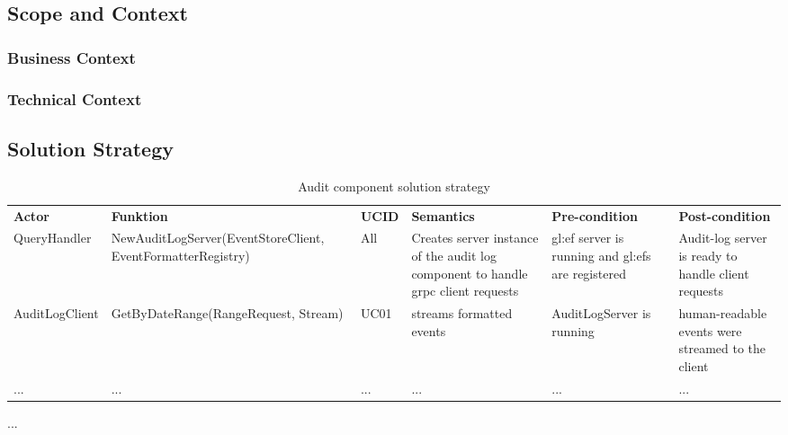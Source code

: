 \subsection{Scope and Context}

\subsubsection{Business Context}


\subsubsection{Technical Context}


\subsection{Solution Strategy}

\begin{table}[H]
  \footnotesize
  \begin{center}
    \caption{Audit component solution strategy}
    \label{tab:acss}
    \def\arraystretch{1.5}
    \begin{tabularx}{\linewidth}{|l X l X X X |}
      \hline
      \rowcolor{gray!20}
      \textbf{Actor} & \textbf{Funktion} & \textbf{UCID} & \textbf{Semantics} & \textbf{Pre-condition} & \textbf{Post-condition}\\
      QueryHandler & New\-Audit\-Log\-Server\-(Event\-Store\-Client, Event\-Formatter\-Registry) & All & Creates server instance of the audit log component to handle grpc client requests & \gls{gl:ef} server is running and \glspl{gl:ef} are registered & Audit-log server is ready to handle client requests  \\
      AuditLogClient & Get\-By\-Date\-Range(Range\-Request, Stream) & UC01 & streams formatted events & Audit\-Log\-Server is running & human-readable events were streamed to the client  \\
      ... & ... & ... & ... & ... & ...  \\
      \hline
    \end{tabularx}
  \end{center}
\end{table}
...

